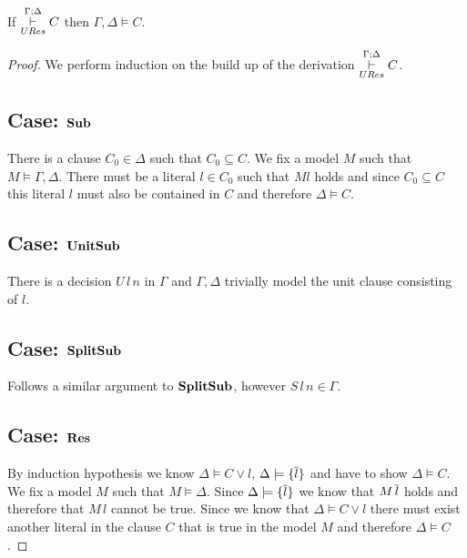 \medskip
\begin{mytheorem}\label{thm:UResSoundness}
If  $ \overset{\Gamma;\Delta}{\underset{URes}{\vdash}} C$ then $\Gamma, \Delta \models C$.
%
\begin{proof}
We perform induction on the build up of  the derivation $ \overset{\Gamma;\Delta}{\underset{URes}{\vdash}} C$.
\subsection*{Case: $\mathbf{Sub}$}
%
There is a clause $C_0 \in \Delta$ such that $C_0 \subseteq C$. We fix a model $M$ such that $M \models \Gamma, \Delta $. There must be a literal $l \in C_0$ such that $M l$ holds and since $C_0 \subseteq C$ this literal $l$ must also be contained in $C$ and therefore $\Delta \models C$.
%
\subsection*{Case: $\mathbf{UnitSub}$}
There is a decision $U \, l \, n$ in $\Gamma$ and $\Gamma,\Delta$ trivially model the unit clause consisting of $l$. 
%
\subsection*{Case: $\mathbf{SplitSub}$}
Follows a similar argument to $\mathbf{SplitSub}$, however $S \, l \, n \in \Gamma$.
\subsection*{Case: $\mathbf{Res}$}
By induction hypothesis we know $ \Delta \models C \vee l$, $ \Delta \models \{ \overline{l} \}$ and have to show $ \Delta \models C$. We fix a model $M$ such that $M \models \Delta$.  Since $ \Delta \models \{ \overline{l} \}$ we know that $M \, \overline{l}$ holds and therefore that $M \, l$ cannot be true. Since we know that $ \Delta \models C \vee l$ there must exist another literal in the clause $C$ that is true in the model $M$ and therefore $\Delta \models C$.
\end{proof}
\end{mytheorem} 

